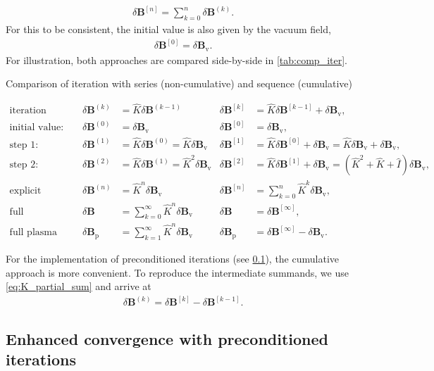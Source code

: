 \documentclass[a4paper, twoside, 10pt, english]{article}
\numberwithin{equation}{section}
\let\vec\symbf
\newcommand*\Bvac{\ensuremath{\delta \vec{B}_{\text{v}}}}  %
\newcommand*\Bplas{\ensuremath{\delta \vec{B}_{\text{p}}}}  %
\newcommand*\Bpert{\ensuremath{\delta \vec{B}}}  %
\begin{document}
\begin{gather}
  \Bpert^{[n]} = \sum_{k = 0}^{n} \Bpert^{(k)}. \label{eq:K_partial_sum}
\end{gather}
For this to be consistent, the initial value is also given by the vacuum field,
\begin{gather}
  \Bpert^{[0]} = \Bvac.
\end{gather}
For illustration, both approaches are compared side-by-side in \cref{tab:comp_iter}.
\begin{table}[bth]
  \caption{Comparison of iteration with series (non-cumulative) and sequence (cumulative)}
  \label{tab:comp_iter}
  \begin{align*}
    \text{iteration step:} && \Bpert^{(k)} &= \hat{K} \Bpert^{(k-1)} & \Bpert^{[k]} &= \hat{K} \Bpert^{[k-1]} + \Bvac, \\
    \text{initial value:} && \Bpert^{(0)} &= \Bvac & \Bpert^{[0]} &= \Bvac, \\
    \text{step 1:} && \Bpert^{(1)} &= \hat{K} \Bpert^{(0)} = \hat{K} \Bvac & \Bpert^{[1]} &= \hat{K} \Bpert^{[0]} + \Bvac = \hat{K} \Bvac + \Bvac, \\
    \text{step 2:} && \Bpert^{(2)} &= \hat{K} \Bpert^{(1)} = \hat{K}^{2} \Bvac & \Bpert^{[2]} &= \hat{K} \Bpert^{[1]} + \Bvac = \left ( \hat{K}^{2} + \hat{K} + \hat{I} \right ) \Bvac, \\
    \text{explicit form:} && \Bpert^{(n)} &= \hat{K}^{n} \Bvac & \Bpert^{[n]} &= \sum_{k = 0}^{n} \hat{K}^{k} \Bvac, \\
    \text{full perturbation:} && \Bpert &= \sum_{k = 0}^{\infty} \hat{K}^{n} \Bvac & \Bpert &= \Bpert^{[\infty]}, \\
    \text{full plasma response:} && \Bplas &= \sum_{k = 1}^{\infty} \hat{K}^{n} \Bvac & \Bplas &= \Bpert^{[\infty]} - \Bvac.
  \end{align*}
\end{table}
For the implementation of preconditioned iterations (see \cref{sec:Arnoldi}), the cumulative approach is more convenient. To reproduce the intermediate summands, we use \cref{eq:K_partial_sum} and arrive at
\begin{gather}
  \Bpert^{(k)} = \Bpert^{[k]} - \Bpert^{[k-1]}.
\end{gather}

\subsection{Enhanced convergence with preconditioned iterations}
\label{sec:Arnoldi}
\end{document}
